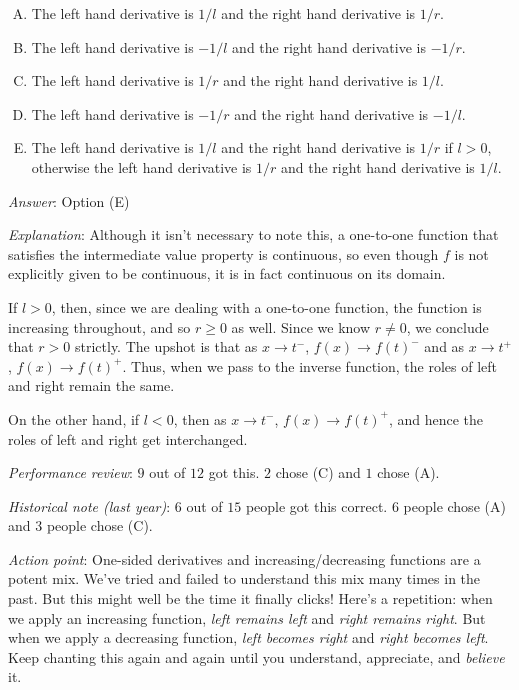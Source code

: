 \documentclass[10pt]{amsart}
\begin{document}
\begin{enumerate}
  \begin{enumerate}[(A)]
  \item The left hand derivative is $1/l$ and the right hand
    derivative is $1/r$.
  \item The left hand derivative is $-1/l$ and the right hand
    derivative is $-1/r$.
  \item The left hand derivative is $1/r$ and the right hand
    derivative is $1/l$.
  \item The left hand derivative is $-1/r$ and the right hand
    derivative is $-1/l$.
  \item The left hand derivative is $1/l$ and the right hand
    derivative is $1/r$ if $l > 0$, otherwise the left hand derivative
    is $1/r$ and the right hand derivative is $1/l$.
  \end{enumerate}
  
  {\em Answer}: Option (E)

  {\em Explanation}: Although it isn't necessary to note this, a
  one-to-one function that satisfies the intermediate value property
  is continuous, so even though $f$ is not explicitly given to be
  continuous, it is in fact continuous on its domain.

  If $l > 0$, then, since we are dealing with a one-to-one function,
  the function is increasing throughout, and so $r \ge 0$ as
  well. Since we know $r \ne 0$, we conclude that $r > 0$
  strictly. The upshot is that as $x \to t^-$, $f(x) \to f(t)^-$ and
  as $x \to t^+$, $f(x) \to f(t)^+$. Thus, when we pass to the inverse
  function, the roles of left and right remain the same.

  On the other hand, if $l < 0$, then as $x \to t^-$, $f(x) \to
  f(t)^+$, and hence the roles of left and right get interchanged.

  {\em Performance review}: $9$ out of $12$ got this. $2$ chose (C)
  and $1$ chose (A).

  {\em Historical note (last year)}: $6$ out of $15$ people got this
  correct. $6$ people chose (A) and $3$ people chose (C).

  {\em Action point}: One-sided derivatives and increasing/decreasing
  functions are a potent mix. We've tried and failed to understand
  this mix many times in the past. But this might well be the time it
  finally clicks! Here's a repetition: when we apply an increasing
  function, {\em left remains left} and {\em right remains right}. But
  when we apply a decreasing function, {\em left becomes right} and
  {\em right becomes left}. Keep chanting this again and again until
  you understand, appreciate, and {\em believe} it.



\end{enumerate}
\end{document}
